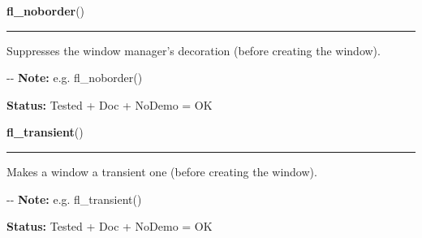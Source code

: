 \hspace{.8\funcindent}\begin{boxedminipage}{\funcwidth}

    \raggedright \textbf{fl\_noborder}()

    \vspace{-1.5ex}

    \rule{\textwidth}{0.5\fboxrule}
\setlength{\parskip}{2ex}

Suppresses the window manager's decoration (before creating the
window).

-{}-
\setlength{\parskip}{1ex}
\textbf{Note:} 
e.g. fl\_noborder()


\textbf{Status:} 
Tested + Doc + NoDemo = OK


    \end{boxedminipage}

    \label{xformslib:flxbasic:fl_transient}

    \vspace{0.5ex}

\hspace{.8\funcindent}\begin{boxedminipage}{\funcwidth}

    \raggedright \textbf{fl\_transient}()

    \vspace{-1.5ex}

    \rule{\textwidth}{0.5\fboxrule}
\setlength{\parskip}{2ex}

Makes a window a transient one (before creating the window).

-{}-
\setlength{\parskip}{1ex}
\textbf{Note:} 
e.g. fl\_transient()


\textbf{Status:} 
Tested + Doc + NoDemo = OK


    \end{boxedminipage}

    \label{xformslib:flxbasic:fl_get_winsize}

    \vspace{0.5ex}

